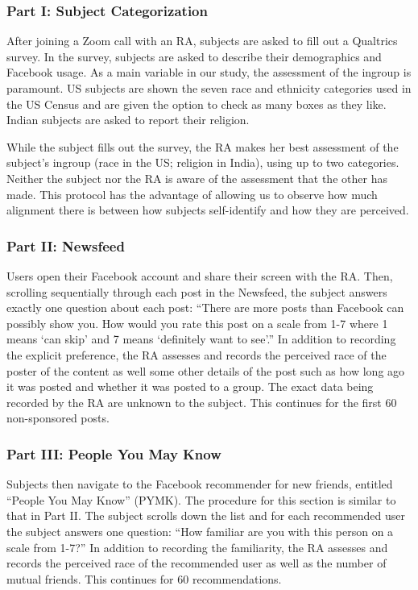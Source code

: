 \documentclass[12pt,letterpaper]{article}
\begin{document}
\subsubsection{Part I: Subject Categorization} After joining a Zoom call with an RA, subjects are asked to fill out a Qualtrics survey. In the survey, subjects are asked to describe their demographics and Facebook usage. As a main variable in our study, the assessment of the ingroup is paramount. US subjects are shown the seven race and ethnicity categories used in the US Census and are given the option to check as many boxes as they like. Indian subjects are asked to report their religion.

While the subject fills out the survey, the RA makes her best assessment of the subject’s ingroup (race in the US; religion in India), using up to two categories. Neither the subject nor the RA is aware of the assessment that the other has made. This protocol has the advantage of allowing us to observe how much alignment there is between how subjects self-identify and how they are perceived.

\subsubsection{Part II: Newsfeed} Users open their Facebook account and share their screen with the RA. Then, scrolling sequentially through each post in the Newsfeed, the subject answers exactly one question about each post: “There are more posts than Facebook can possibly show you. How would you rate this post on a scale from 1-7 where 1 means ‘can skip’ and 7 means ‘definitely want to see’.” In addition to recording the explicit preference, the RA assesses and records the perceived race of the poster of the content as well some other details of the post such as how long ago it was posted and whether it was posted to a group. The exact data being recorded by the RA are unknown to the subject. This continues for the first 60 non-sponsored posts.

\subsubsection{Part III: People You May Know} Subjects then navigate to the Facebook recommender for new friends, entitled “People You May Know” (PYMK). The procedure for this section is similar to that in Part II. The subject scrolls down the list and for each recommended user the subject answers one question: “How familiar are you with this person on a scale from 1-7?” In addition to recording the familiarity, the RA assesses and records the perceived race of the recommended user as well as the number of mutual friends. This continues for 60 recommendations.
\end{document}
